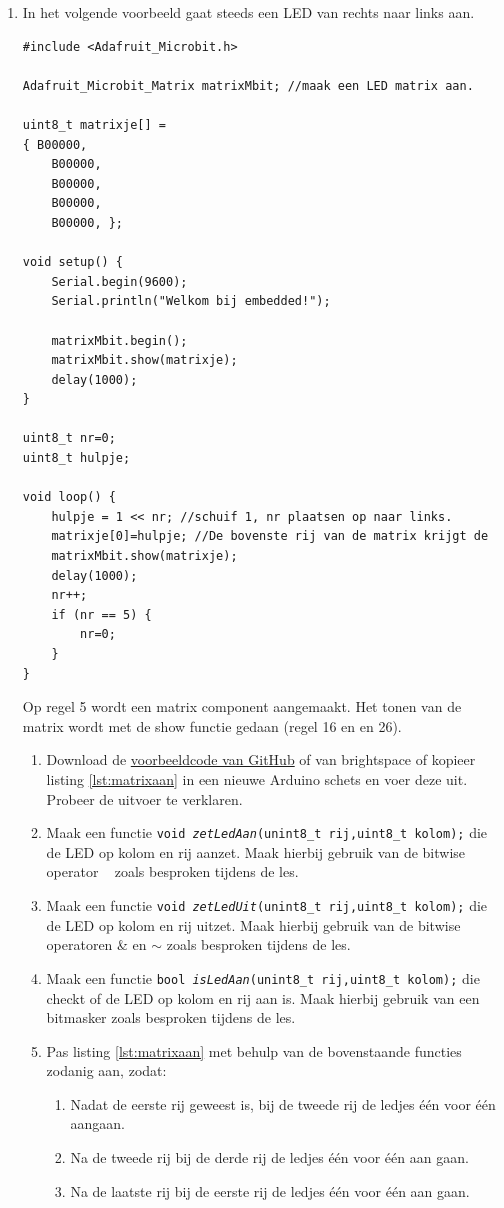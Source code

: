 \begin{enumerate}
\item In het volgende voorbeeld gaat steeds een LED van rechts naar links aan.

\begin{lstlisting}[caption={Looplicht van de bovenste rij.},label={lst:matrixaan2}]
#include <Adafruit_Microbit.h>

Adafruit_Microbit_Matrix matrixMbit; //maak een LED matrix aan.

uint8_t matrixje[] =
{ B00000,
	B00000,
	B00000,
	B00000,
	B00000, };

void setup() {
	Serial.begin(9600);
	Serial.println("Welkom bij embedded!");

    matrixMbit.begin();
	matrixMbit.show(matrixje);
	delay(1000);  
}

uint8_t nr=0;
uint8_t hulpje;

void loop() {
	hulpje = 1 << nr; //schuif 1, nr plaatsen op naar links.
	matrixje[0]=hulpje; //De bovenste rij van de matrix krijgt de 
	matrixMbit.show(matrixje);
	delay(1000);
	nr++;
	if (nr == 5) {
	    nr=0;
	}        
}
\end{lstlisting}
Op regel 5 wordt een matrix component aangemaakt. Het tonen van de matrix wordt met de show functie gedaan (regel 16 en en 26).

\begin{enumerate}
	\item Download de  \href{https://github.com/JohnVi-hhs/embsysP/tree/main/voorbeelden/matrixloopl.ino}{voorbeeldcode van GitHub} of van brightspace of kopieer listing \ref{lst:matrixaan} in een nieuwe Arduino schets en voer deze uit.\\
	Probeer de uitvoer te verklaren.

\item Maak een functie \texttt{void \textit{zetLedAan}(unint8\_t rij,uint8\_t kolom);} die de LED op kolom en rij aanzet. Maak hierbij gebruik van de bitwise operator \textbar ~ zoals besproken tijdens de les.
\item Maak een functie \texttt{void \textit{zetLedUit}(unint8\_t rij,uint8\_t kolom);} die de LED op kolom en rij uitzet. Maak hierbij gebruik van de bitwise operatoren \& en $\sim$ zoals besproken tijdens de les.
\item Maak een functie \texttt{bool \textit{isLedAan}(unint8\_t rij,uint8\_t kolom);} die checkt of de LED op kolom en rij aan is. Maak hierbij gebruik van een bitmasker zoals besproken tijdens de les.

	\item Pas listing \ref{lst:matrixaan} met behulp van de bovenstaande functies zodanig aan, zodat:
\begin{enumerate}%
	\item Nadat de eerste rij geweest is, bij de tweede rij de ledjes \'{e}\'{e}n voor \'{e}\'{e}n  aangaan. 
	\item Na de tweede rij bij de derde rij de ledjes \'{e}\'{e}n voor \'{e}\'{e}n  aan gaan. 
	\item Na de laatste rij bij de eerste rij de ledjes \'{e}\'{e}n voor \'{e}\'{e}n  aan gaan. 
\end{enumerate}


\end{enumerate}
\end{enumerate}
